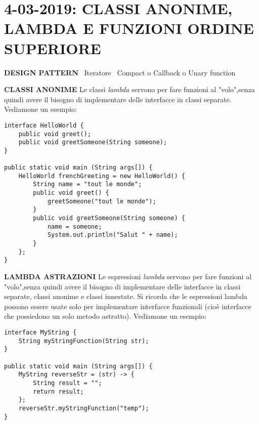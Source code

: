 

\newpage
\section{4-03-2019: CLASSI ANONIME, LAMBDA E FUNZIONI ORDINE SUPERIORE}
\textbf{DESIGN PATTERN} \newline
\textbullet\ Iteratore \newline
\textbullet\ Compact o Callback o Unary function 

\noindent \textbf{CLASSI ANONIME} \newline
Le classi \textit{lambda} servono per fare funzioni al "volo",senza quindi avere il bisogno di implementare delle interfacce in classi separate. Vediamone un esempio:

\begin{lstlisting}[basicstyle=\small,]
interface HelloWorld {
	public void greet();
    public void greetSomeone(String someone);
}

public static void main (String args[]) {
    HelloWorld frenchGreeting = new HelloWorld() {
        String name = "tout le monde";
        public void greet() {
            greetSomeone("tout le monde");
        }
        public void greetSomeone(String someone) {
            name = someone;
            System.out.println("Salut " + name);
        }
    };
}

\end{lstlisting}

\noindent \textbf{LAMBDA ASTRAZIONI} \newline
Le espressioni \textit{lambda} servono per fare funzioni al "volo",senza quindi avere il bisogno di implementare delle interfacce in classi separate, classi anonime e classi innestate. Si ricorda che le espressioni lambda possono essere usate solo per implementare interfacce funzionali (cioè interfacce che possiedono un solo metodo astratto). Vediamone un esempio:

\begin{lstlisting}[basicstyle=\small,]
interface MyString {
	String myStringFunction(String str);
}

public static void main (String args[]) {
	MyString reverseStr = (str) -> {
		String result = "";		
		return result;
	};
	reverseStr.myStringFunction("temp");
}
\end{lstlisting}


